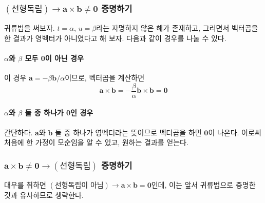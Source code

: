 \documentclass{scrartcl}
\begin{document}
\subsubsection{\((\text{선형독립})\longrightarrow\mathbf{a}\times\mathbf{b}\neq\mathbf{0}\) 증명하기}
귀류법을 써보자. \(t=\alpha\), \(u=\beta\)라는 자명하지 않은 해가 존재하고, 그러면서 벡터곱을 한 결과가 영벡터가 아니였다고 해 보자. 다음과 같이 경우를 나눌 수 있다.
\paragraph{\(\alpha\)와 \(\beta\) 모두 0이 아닌 경우}
이 경우 \(\mathbf{a}=-\beta\mathbf{b}/\alpha\)이므로, 벡터곱을 계산하면
\[\mathbf{a}\times\mathbf{b}=-\frac{\beta}{\alpha}\mathbf{b}\times\mathbf{b}=\mathbf{0}\]

\paragraph{\(\alpha\)와 \(\beta\) 둘 중 하나가 0인 경우}
간단하다. \(\mathbf{a}\)와 \(\mathbf{b}\) 둘 중 하나가 영벡터라는 뜻이므로 벡터곱을 하면 \(\mathbf{0}\)이 나온다. 이로써 처음에 한 가정이 모순임을 알 수 있고, 원하는 결과를 얻는다.

\subsubsection{\(\mathbf{a}\times\mathbf{b}\neq\mathbf{0}\longrightarrow(\text{선형독립})\) 증명하기}
대우를 취하면 \((\text{선형독립이 아님})\longrightarrow\mathbf{a}\times\mathbf{b}=\mathbf{0}\)인데, 이는 앞서 귀류법으로 증명한 것과 유사하므로 생략한다.
\end{document}

